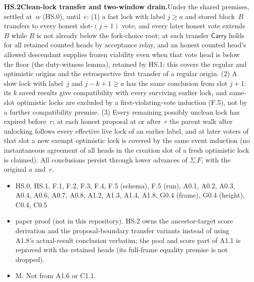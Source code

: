 \documentclass{article}
\newcommand{\dagnode}[6]{%
\par\medskip\noindent\textbf{#1\enspace #2.}\enspace #3
\begin{itemize}[leftmargin=2.2em,itemsep=0pt,topsep=2pt]
\item[\emph{Uses}] #4
\item[\emph{Evid.}] #5
\item[\emph{Task}] #6
\end{itemize}}
\begin{document}
\dagnode{HS.2}{Clean-lock transfer and two-window drain}{Under the shared
premises, settled at~$w$ (HS.0), until~$e$: (1) a fast lock with label
$j\geq a$ and stored block~$B$ transfers to every honest slot-$(j+1)$ vote,
and every later honest vote extends~$B$ while $B$ is not already below the
fork-choice root; at each transfer $\mathsf{Carry}$ holds for all retained
counted heads by acceptance relay, and an honest counted head's allowed
descendant supplies frozen viability even when that vote head is below the
floor (the duty-witness lemma), retained by HS.1; this covers the regular and
optimistic origins and the retrospective first transfer of a regular origin.
(2) A slow lock with label~$j$ and $j-k+1\geq a$ has the same conclusion from
slot $j+1$: its $k$ saved results give compatibility with every surviving
earlier lock, and same-slot optimistic locks are excluded by a
first-violating-vote induction (F.5), not by a further compatibility
premise.  (3) Every remaining possibly unclean lock has expired before~$r$; at
each honest proposal at or after~$r$ the parent walk after unlocking follows
every effective live lock of an earlier label, and at later voters of that
slot a new exempt optimistic lock is covered by the same event induction (no
instantaneous agreement of all heads in the creation slot of a fresh
optimistic lock is claimed).  All conclusions persist through lower advances
of $\Sigma.F$, with the original $a$ and~$r$.}
{HS.0, HS.1, F.1, F.2, F.3, F.4, F.5 (schema), F.5 (run), A0.1, A0.2, A0.3,
A0.4, A0.6, A0.7, A0.8, A1.2, A1.3, A1.4, A1.8, G0.4 (frame), G0.4 (height),
C0.4, C0.5}{paper proof (not in this repository).  HS.2 owns the ancestor-target score
derivation and the proposal-boundary transfer variants instead of using
A1.8's actual-result conclusion verbatim; the pool and score part of A1.1 is
reproved with the retained heads (its full-frame equality premise is not
dropped).}{M.  Not from A1.6 or C1.1.}
\end{document}
